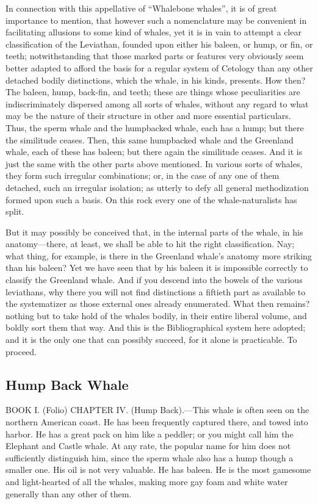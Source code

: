 In connection with this appellative of ``Whalebone whales'', it is of great importance to mention, that however such a nomenclature may be convenient in facilitating allusions to some kind of whales, yet it is in vain to attempt a clear classification of the Leviathan, founded upon either his baleen, or hump, or fin, or teeth; notwithstanding that those marked parts or features very obviously seem better adapted to afford the basis for a regular system of Cetology than any other detached bodily distinctions, which the whale, in his kinds, presents. How then? The baleen, hump, back-fin, and teeth; these are things whose peculiarities are indiscriminately dispersed among all sorts of whales, without any regard to what may be the nature of their structure in other and more essential particulars. Thus, the sperm whale and the humpbacked whale, each has a hump; but there the similitude ceases. Then, this same humpbacked whale and the Greenland whale, each of these has baleen; but there again the similitude ceases. And it is just the same with the other parts above mentioned. In various sorts of whales, they form such irregular combinations; or, in the case of any one of them detached, such an irregular isolation; as utterly to defy all general methodization formed upon such a basis. On this rock every one of the whale-naturalists has split.

But it may possibly be conceived that, in the internal parts of the whale, in his anatomy—there, at least, we shall be able to hit the right classification. Nay; what thing, for example, is there in the Greenland whale’s anatomy more striking than his baleen? Yet we have seen that by his baleen it is impossible correctly to classify the Greenland whale. And if you descend into the bowels of the various leviathans, why there you will not find distinctions a fiftieth part as available to the systematizer as those external ones already enumerated. What then remains? nothing but to take hold of the whales bodily, in their entire liberal volume, and boldly sort them that way. And this is the Bibliographical system here adopted; and it is the only one that can possibly succeed, for it alone is practicable. To proceed.

\subsection{Hump Back Whale}

BOOK I. (Folio) CHAPTER IV. (Hump Back).—This whale is often seen on the northern American coast. He has been frequently captured there, and towed into harbor. He has a great pack on him like a peddler; or you might call him the Elephant and Castle whale. At any rate, the popular name for him does not sufficiently distinguish him, since the sperm whale also has a hump though a smaller one. His oil is not very valuable. He has baleen. He is the most gamesome and light-hearted of all the whales, making more gay foam and white water generally than any other of them.

